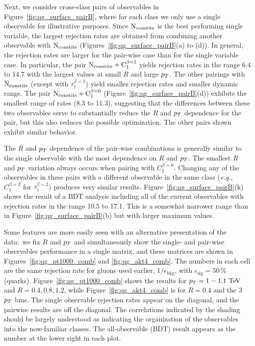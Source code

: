 Next, we consider  cross-class pairs of observables  in Figure~\ref{fig:qg_surface_pairB}, where for each class we only use a single observable for illustrative purposes.
Since $\rm N_{constits}$ is the best performing single variable, the largest rejection
rates are obtained from combining another observable with $\rm{N_ {constits}}$ (Figures~\ref{fig:qg_surface_pairB}(a) to (d)).  
In general, the rejection rates are larger for the pair-wise case
than for the single variable case.  In particular, the pair $\rm{N_ {constits}}+ C_1^{\beta=1}$ 
yields rejection rates in the range 6.4 to 14.7 with the largest
values at small $R$ and large $p_T$.  The other pairings with $\rm{N_ {constits}}$ (except with $\tau_1^{\beta=1}$) yield smaller 
rejection rates and smaller dynamic range.  The pair $\rm{N_ {constits}}+ C_1^{\beta=0}$ (Figure~\ref{fig:qg_surface_pairB}(d)) exhibits
the smallest range of rates (8.3 to 11.3), suggesting that the differences between these two observables serve to substantially 
reduce the $R$ and $p_T$ dependence for the pair, but this also reduces the possible optimization.  The other pairs shown exhibit
similar behavior.  

The $R$ and $p_T$ dependence of the pair-wise combinations is generally similar to the single observable with the most dependence on $R$ and $p_T$.  The smallest $R$ and $p_T$ variation always occurs 
when pairing with $C_1^{\beta=0}$.  Changing any of the observables in these pairs with a different observable in the same class (\textit{e.g.},
$C_1^{\beta=2}$ for $\tau_1^{\beta=2}$) produces very similar results.  Figure~\ref{fig:qg_surface_pairB}(k) shows the
result of a BDT analysis including all of the current observables with rejection rates in the range 10.5 to 17.1.  This is a somewhat narrower range
than in Figure~\ref{fig:qg_surface_pairB}(b) but with  larger maximum values.

Some features are more easily seen with an alternative presentation of the data:~we fix  $R$ and $p_T$ and simultaneously show the single- and pair-wise  observables performance in a single matrix, and these matrices are shown in Figures~\ref{fig:qg_pt1000_comb} and \ref{fig:qg_akt4_comb}.  The numbers in each cell are the same rejection rate for gluons used earlier,
 $1/\epsilon_\text{bkg}$, with $\epsilon_\text{sig}= 50\,\% $ (quarks).  Figure~\ref{fig:qg_pt1000_comb} shows the results for $\pt=1-1.1 \TeV$ and
$R =0.4,0.8,1.2$, while  Figure~\ref{fig:qg_akt4_comb} is for $R = 0.4$ and the 3 $p_T$ bins.  The single observable rejection rates appear on the diagonal, and the pairwise results are off the diagonal. 
The correlations indicated by the shading should be largely understood as indicating the organization of the observables into the now-familiar
classes.  The all-observable (BDT) result appears as the number at the lower right in each plot.

